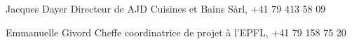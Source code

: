 \begin{cvskills}

  \cvskill
    {Jacques Dayer} %
    {Directeur de AJD Cuisines et Bains Sàrl, +41 79 413 58 09} %
    
	\cvskill
	{Emmanuelle Givord}
	{Cheffe coordinatrice de projet à l'EPFL, +41 79 158 75 20}
    
    
    


\end{cvskills}
